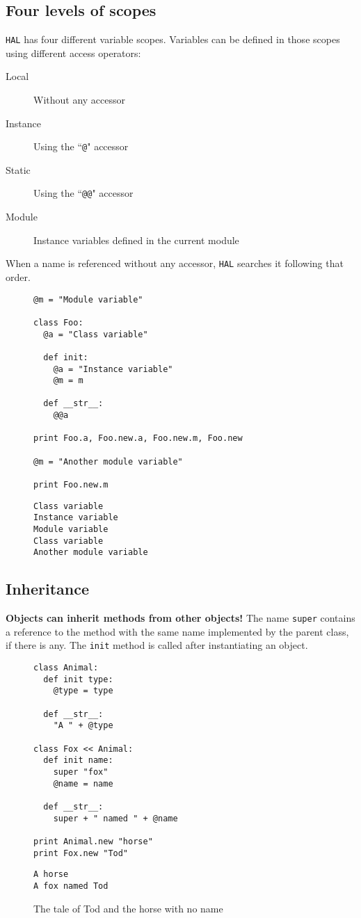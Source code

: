 \documentclass[a4paper,11pt]{article}
\begin{document}
\subsection{Four levels of scopes}
\texttt{HAL} has four different variable scopes. Variables can be defined in those scopes
  using different access operators:
\begin{description}
\item[Local]
Without any accessor
\item[Instance]
Using the ``\texttt{@}" accessor
\item[Static]
Using the ``\texttt{@@}" accessor
\item[Module]
Instance variables defined in the current module
\end{description}
When a name is referenced without any accessor, \texttt{HAL} searches it following that order.
\begin{figure}[h!]
\begin{lstlisting}[language=hal]
@m = "Module variable"

class Foo:
  @a = "Class variable"

  def init:
    @a = "Instance variable"
    @m = m

  def __str__:
    @@a

print Foo.a, Foo.new.a, Foo.new.m, Foo.new

@m = "Another module variable"

print Foo.new.m
\end{lstlisting}
\begin{lstlisting}[language=output]
Class variable
Instance variable
Module variable
Class variable
Another module variable
\end{lstlisting}
\caption{}
\label{scope}
\end{figure}
\clearpage
\subsection{Inheritance}
\textbf{Objects can inherit methods from other objects!} The name \texttt{super} contains a reference to the method
  with the same name implemented by the parent class, if there is any. The \texttt{init} method is called after
  instantiating an object.
\begin{figure}[h!]
\begin{lstlisting}[language=hal]
class Animal:
  def init type:
    @type = type

  def __str__:
    "A " + @type

class Fox << Animal:
  def init name:
    super "fox"
    @name = name

  def __str__:
    super + " named " + @name

print Animal.new "horse"
print Fox.new "Tod"
\end{lstlisting}
\begin{lstlisting}[language=output]
A horse
A fox named Tod
\end{lstlisting}
\caption{The tale of Tod and the horse with no name}
\label{inheritance}
\end{figure}
\clearpage
\end{document}
